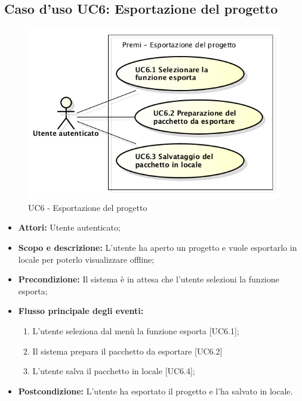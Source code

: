 \subsection{Caso d'uso UC6: Esportazione del progetto}
	\begin{figure}[h]
		\centering
		\includegraphics[scale=0.45] {img/UC6.png}
		\caption{UC6 - Esportazione del progetto}
	\end{figure}

	\begin{itemize}
		\item \textbf{Attori:} Utente autenticato;
		\item \textbf{Scopo e descrizione:} L'utente ha aperto un progetto e vuole esportarlo in locale per poterlo visualizzare offline;
		\item \textbf{Precondizione:} Il sistema è in attesa che l'utente selezioni la funzione esporta;
		\item \textbf{Flusso principale degli eventi:}
		\begin{enumerate}
			\item L'utente seleziona dal menù la funzione esporta [UC6.1];
			\item Il sistema prepara il pacchetto da esportare [UC6.2]
			\item L'utente salva il pacchetto in locale [UC6.4];
		\end{enumerate}
		\item \textbf{Postcondizione:} L'utente ha esportato il progetto e l'ha salvato in locale.
	\end{itemize}


